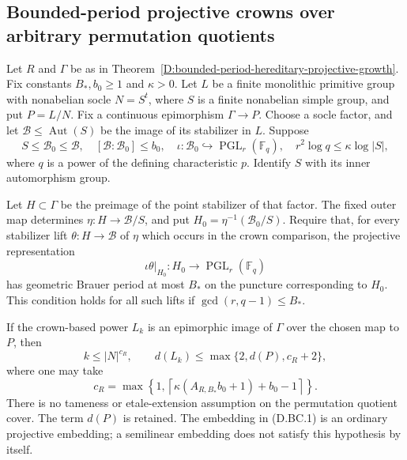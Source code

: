\subsection{Bounded-period projective crowns over arbitrary permutation quotients}

\begin{corollary}
\label{D:bounded-period-arbitrary-quotient-projective-crowns}
Let $R$ and $\Gamma$ be as in
Theorem~\ref{D:bounded-period-hereditary-projective-growth}.
Fix constants
$B_*,b_0\ge1$ and $\kappa>0$.
Let $L$ be a finite monolithic primitive group with
nonabelian socle $N=S^t$, where $S$ is a finite nonabelian
simple group, and put $P=L/N$.
Fix a continuous epimorphism $\Gamma\to P$.
Choose a socle factor, and let $\mathcal B\le\operatorname{Aut}(S)$
be the image of its stabilizer in $L$. Suppose
\[
 S\le\mathcal B_0\le\mathcal B,
 \quad [\mathcal B:\mathcal B_0]\le b_0,
 \quad \iota:\mathcal B_0\hookrightarrow
                     \operatorname{PGL}_r(\mathbb F_q),
 \quad r^2\log q\le\kappa\log|S|,                    \tag{D.BC.1}
\]
where $q$ is a power of the defining characteristic $p$.
Identify $S$ with its inner automorphism group.

Let $H\subset\Gamma$ be the preimage of the point
stabilizer of that factor. The fixed outer map determines
$\eta:H\to\mathcal B/S$, and put
$H_0=\eta^{-1}(\mathcal B_0/S)$.
Require that, for every stabilizer lift $\theta:H\to\mathcal B$
of $\eta$ which occurs in the crown comparison, the
projective representation
\[
                  \iota\theta|_{H_0}:H_0\to
                                  \operatorname{PGL}_r(\mathbb F_q)
                                                        \tag{D.BC.2}
\]
has geometric Brauer period at most $B_*$ on the puncture
corresponding to $H_0$. This condition holds for all such
lifts if $\gcd(r,q-1)\le B_*$.

If the crown-based power $L_k$ is an epimorphic image
of $\Gamma$ over the chosen map to $P$, then
\[
 k\le |N|^{c_R},\qquad
 d(L_k)\le\max\{2,d(P),c_R+2\},                       \tag{D.BC.3}
\]
where one may take
\[
 c_R=\max\left\{1,
   \left\lceil\kappa(A_{R,B_*}b_0+1)+b_0-1\right\rceil\right\}.
                                                        \tag{D.BC.4}
\]
There is no tameness or etale-extension assumption on
the permutation quotient cover. The term $d(P)$ is
retained. The embedding in (D.BC.1) is an ordinary
projective embedding; a semilinear embedding does not
satisfy this hypothesis by itself.
\end{corollary}

